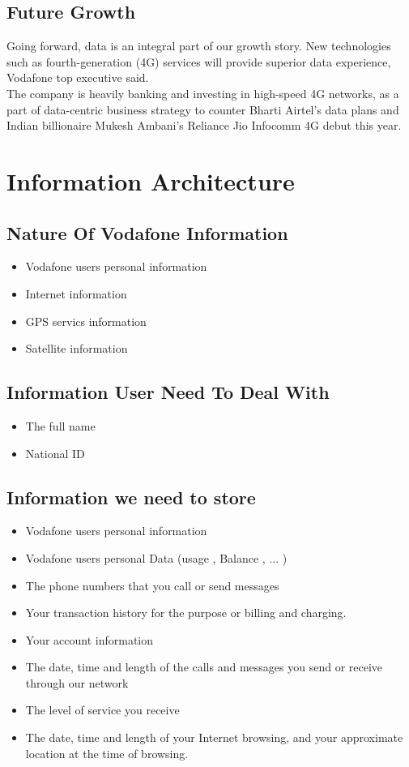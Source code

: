 \documentclass{book}
\begin{document}
\section{Future Growth}
Going forward, data is an integral part of our growth story. New technologies such as
fourth-generation (4G) services will provide superior data experience, Vodafone top executive said. 
\\The company is heavily banking and investing in high-speed 4G networks, as a part of data-centric 
business strategy to counter Bharti Airtel's data plans and Indian billionaire Mukesh Ambani's Reliance Jio Infocomm 4G debut this year. 

\chapter {Information Architecture}

\section{Nature Of Vodafone Information}

\begin{itemize}
	
	\item Vodafone users personal information
	\item Internet information 
	\item GPS servics information 
	\item Satellite information  

\end{itemize}

\section{Information User Need To Deal With}
\begin{itemize}
\item The full name
\item National ID
\end{itemize}

\section{Information we need to store}

\begin{itemize}
	\item Vodafone users personal information
\item Vodafone users personal Data (usage , Balance , ... )
\item The phone numbers that you call or send messages	
\item Your transaction history for the purpose or billing and charging.
\item Your account information
\item The date, time and length of the calls and messages you send or receive through our network
\item The level of service you receive
\item The date, time and length of your Internet browsing, and your approximate location at the time of browsing.
\end{itemize}
\end{document}
